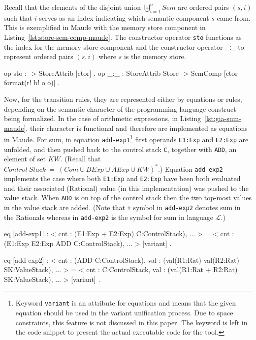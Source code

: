 \documentclass{llncs}%
\begin{document}
Recall that the elements of the disjoint union $\biguplus^n_{i=1} \mathit{Sem}$ are ordered pairs $(s, i)$ such that $i$ serves as an index indicating which semantic component $s$ came from. This is exemplified in Maude with the memory store component in Listing~\ref{lst:store-sem-comp-maude}. The constructor operator \texttt{sto} functions as the index for the memory store component and the constructor operator \texttt{\_:\_} to represent ordered pairs $(s, i)$ where $s$ is the memory store.  
\begin{maude}[caption=Memory store semantic component in Maude, label=lst:store-sem-comp-maude]
    op sto : -> StoreAttrib [ctor] .
    op _:_ : StoreAttrib Store -> SemComp [ctor format(r! b! o o)] .
\end{maude}

Now, for the transition rules, they are represented either by equations or rules, depending on the semantic character of the programming language construct being formalized. In the case of arithmetic expressions, in Listing~\ref{lst:gia-sum-maude}, their character is functional and therefore are implemented as equations in Maude. For sum, in equation \texttt{add-exp1}\footnote{Keyword \texttt{variant} is an attribute for equations and means that the given equation should be used in the variant unification process. Due to space constraints, this feature is not discussed in this paper. The keyword is left in the code snippet to present the actual executable code for the tool.}  first operands \texttt{E1:Exp} and \texttt{E2:Exp} are unfolded, and then pushed back to the control stack \texttt{C}, together with \texttt{ADD}, an element of set $\mathit{KW}$. (Recall that $\mathit{Control~Stack} ~=~ (\mathit{Com} \cup \mathit{BExp} \cup \mathit{AExp} \cup \mathit{KW})^*$.) Equation \texttt{add-exp2} implements the case where both \texttt{E1:Exp} and \texttt{E2:Exp} have been both evaluated and their associated (Rational) value (in this implementation) was pushed to the value stack. When \texttt{ADD} is on top of the control stack then the two top-most values in the value stack are added. (Note that \texttt{+} symbol in \texttt{add-exp2} denotes sum in the Rationals whereas in  \texttt{add-exp2} is the symbol for sum in language $\mathcal{L}$.)
\begin{maude}[caption=$\uppi$-automaton sum rules in Maude, label=lst:gia-sum-maude]
eq [add-exp1] : < cnt : (E1:Exp + E2:Exp) C:ControlStack), ... >  =
               < cnt : (E1:Exp E2:Exp ADD C:ControlStack), ... > [variant] .

eq [add-exp2] : < cnt : (ADD C:ControlStack), 
                 val : (val(R1:Rat) val(R2:Rat) SK:ValueStack), ... >  =
               < cnt : C:ControlStack, 
                 val : (val(R1:Rat + R2:Rat) SK:ValueStack), ... > [variant] .
\end{maude}
\end{document}
